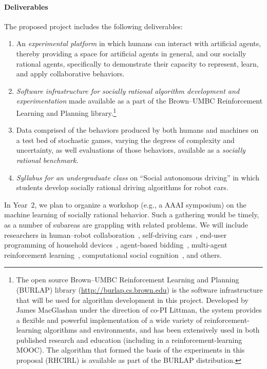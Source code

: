 
\vspace{\up}
\paragraph{Deliverables}

The proposed project includes the following deliverables: 

\begin{enumerate}

\item An {\em experimental platform\/} in which humans can interact
  with artificial agents, thereby providing a space for artificial
  agents in general, and our socially rational agents, specifically to
  demonstrate their capacity to represent, learn, and apply
  collaborative behaviors. %

\item {\em Software infrastructure for socially rational algorithm
  development and experimentation\/} made available as a part of the Brown--UMBC
  Reinforcement Learning and Planning library.\footnote{The open
  source Brown--UMBC Reinforcement Learning and   
  Planning (BURLAP) library (\url{http://burlap.cs.brown.edu}) is the
  software infrastructure that will be used for algorithm development
  in this project.  Developed by James MacGlashan under the direction
  of co-PI Littman, the system provides a flexible and powerful
  implementation of a wide variety of reinforcement-learning
  algorithms and environments, and has been extensively used in both
  published research and education (including in a
  reinforcement-learning MOOC).  The algorithm that formed the basis
  of the experiments in this proposal (RHCIRL) is available as
  part of the BURLAP distribution.}

\item Data comprised of the behaviors produced by both humans and
  machines on a test bed of stochastic games, varying the degrees of
  complexity and uncertainty, as well evaluations of those behaviors,
  available as a {\em socially rational benchmark}.

\item {\em Syllabus for an undergraduate class} on ``Social autonomous
  driving'' in which students develop socially rational driving
  algorithms for robot cars.

\end{enumerate}

In Year~2, we plan to organize a workshop (e.g., a AAAI symposium)
on the machine learning of socially rational behavior. Such a
gathering would be timely, as a number of subareas are grappling with
related problems. We will include researchers in human--robot
collaboration~\cite{gopalan15}, self-driving
cars~\cite{dolgov2010path}, end-user programming of household
devices~\cite{ur14}, agent-based bidding~\cite{tac:book}, multi-agent
reinforcement learning~\cite{sodomka13}, computational social
cognition~\cite{baker14}, and others.
